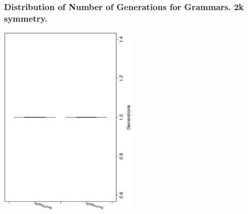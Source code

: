  \begin{frame}
 \frametitle{ Distribution of Number of Generations for Grammars. 2k  symmetry. }
 \begin{center}
\includegraphics[width=0.5\textwidth, angle=-90]
{ExpEboxplottGenerations000.eps}
 \end{center}
 \label{ExpEboxplottGenerations000.eps}  
 \end{frame}

